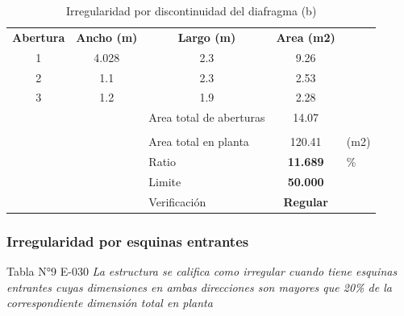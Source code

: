 \begin{table}[h!]
  \centering
  \caption{Irregularidad por discontinuidad del diafragma (b)}
    \begin{tabular}{rr|l|c|r}
\cline{1-4}    \multicolumn{1}{|c|}{\textbf{Abertura}} & \multicolumn{1}{c|}{\textbf{Ancho (m)}} & \multicolumn{1}{c|}{\textbf{Largo (m)}} & \textbf{Area (m2)} &  \\
\cline{1-4}    \multicolumn{1}{|c|}{1} & \multicolumn{1}{c|}{4.028} & \multicolumn{1}{c|}{2.3} & 9.26  &  \\
\cline{1-4}    \multicolumn{1}{|c|}{2} & \multicolumn{1}{c|}{1.1} & \multicolumn{1}{c|}{2.3} & 2.53  &  \\
\cline{1-4}    \multicolumn{1}{|c|}{3} & \multicolumn{1}{c|}{1.2} & \multicolumn{1}{c|}{1.9} & 2.28  &  \\
\cline{1-4}          &       & Area total de aberturas & 14.07 &  \\
\cline{3-4}          & \multicolumn{1}{r}{} & \multicolumn{1}{r}{} & \multicolumn{1}{r}{} &  \\
\cline{3-4}          &       & Area total en planta  & 120.41 & \multicolumn{1}{l}{(m2)} \\
\cline{3-4}          &       & Ratio   & \textbf{11.689} & \multicolumn{1}{l}{\%} \\
\cline{3-4}          &       & Limite & \textbf{50.000} &  \\
\cline{3-4}          &       & Verificación & \textcolor[rgb]{ .267,  .447,  .769}{\textbf{Regular}} &  \\
\cline{3-4}    \end{tabular}%
  \label{tab:addlabel}%
\end{table}%

\subsubsection{Irregularidad por esquinas entrantes}

\begin{mybox2}{Tabla N°9 E-030}
\textit{La estructura se califica como irregular cuando tiene esquinas 
entrantes  cuyas  dimensiones  en  ambas  direcciones  son 
mayores que 20\% de la correspondiente dimensión total en 
planta}
\end{mybox2}

